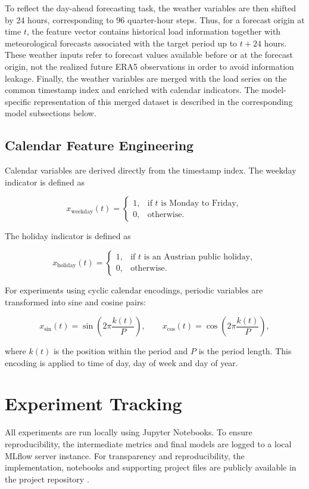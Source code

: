 \documentclass[Master,english,IEEE]{twbook}
\begin{document}
\FloatBarrier

To reflect the day-ahead forecasting task, the weather variables are then shifted by 24 hours, corresponding to 96 quarter-hour steps. Thus, for a forecast origin at time $t$, the feature vector contains historical load information together with meteorological forecasts associated with the target period up to $t + 24$ hours. These weather inputs refer to forecast values available before or at the forecast origin, not the realized future ERA5 observations in order to avoid information leakage. Finally, the weather variables are merged with the load series on the common timestamp index and enriched with calendar indicators. The model-specific representation of this merged dataset is described in the corresponding model subsections below.

\subsection{Calendar Feature Engineering}
Calendar variables are derived directly from the timestamp index. The weekday indicator is defined as

\[
x_{\mathrm{weekday}}(t) =
\begin{cases}
1, & \text{if } t \text{ is Monday to Friday},\\
0, & \text{otherwise}.
\end{cases}
\]

The holiday indicator is defined as

\[
x_{\mathrm{holiday}}(t) =
\begin{cases}
1, & \text{if } t \text{ is an Austrian public holiday},\\
0, & \text{otherwise}.
\end{cases}
\]

For experiments using cyclic calendar encodings, periodic variables are transformed into sine and cosine pairs:

\[
x_{\sin}(t) = \sin\left(2\pi \frac{k(t)}{P}\right),
\qquad
x_{\cos}(t) = \cos\left(2\pi \frac{k(t)}{P}\right),
\]

where \(k(t)\) is the position within the period and \(P\) is the period length. This encoding is applied to time of day, day of week and day of year.

\section{Experiment Tracking}

All experiments are run locally using Jupyter Notebooks. To ensure reproducibility, the intermediate metrics and final models are logged to a local MLflow server instance. For transparency and reproducibility, the implementation, notebooks and supporting project files are publicly available in the project repository \cite{lucashausiLucasHausiProbabilisticloadforecastproject2026}.
 
\end{document}
